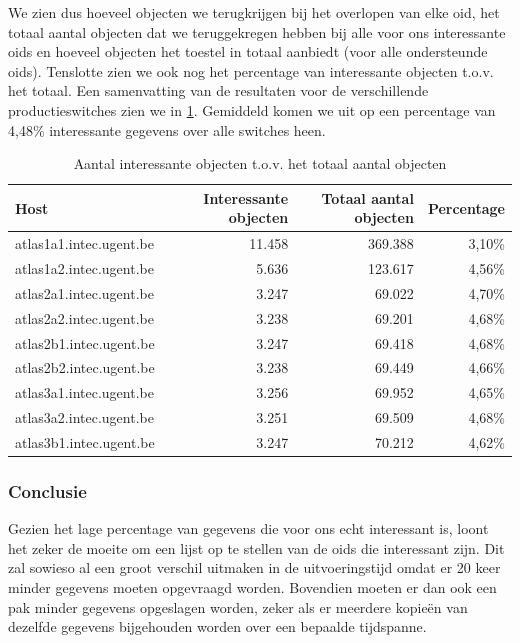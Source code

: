 We zien dus hoeveel objecten we terugkrijgen bij het overlopen van elke \gls{oid},
het totaal aantal objecten dat we teruggekregen hebben bij alle voor ons interessante \glspl{oid} en
hoeveel objecten het toestel in totaal aanbiedt (voor alle ondersteunde \glspl{oid}).
Tenslotte zien we ook nog het percentage van interessante objecten t.o.v. het totaal.
Een samenvatting van de resultaten voor de verschillende productieswitches zien we in \cref{tabel-fracties}.
Gemiddeld komen we uit op een percentage van 4,48\% interessante gegevens over alle switches heen.

\begin{table}[h]
\centering
\begin{tabular}{@{}lrrr@{}}
\toprule
Host                    & Interessante objecten & Totaal aantal objecten & Percentage \\ \midrule
atlas1a1.intec.ugent.be & 11.458                & 369.388                & 3,10\%     \\
atlas1a2.intec.ugent.be & 5.636                 & 123.617                & 4,56\%     \\
atlas2a1.intec.ugent.be & 3.247                 & 69.022                 & 4,70\%     \\
atlas2a2.intec.ugent.be & 3.238                 & 69.201                 & 4,68\%     \\
atlas2b1.intec.ugent.be & 3.247                 & 69.418                 & 4,68\%     \\
atlas2b2.intec.ugent.be & 3.238                 & 69.449                 & 4,66\%     \\
atlas3a1.intec.ugent.be & 3.256                 & 69.952                 & 4,65\%     \\
atlas3a2.intec.ugent.be & 3.251                 & 69.509                 & 4,68\%     \\
atlas3b1.intec.ugent.be & 3.247                 & 70.212                 & 4,62\%     \\ \bottomrule
\end{tabular}
\caption{Aantal interessante objecten t.o.v. het totaal aantal objecten}
\label{tabel-fracties}
\end{table}

\subsubsection{Conclusie}

Gezien het lage percentage van gegevens die voor ons echt interessant is,
loont het zeker de moeite om een lijst op te stellen van de \glspl{oid} die interessant zijn.
Dit zal sowieso al een groot verschil uitmaken in de uitvoeringstijd omdat er 20 keer minder gegevens moeten opgevraagd worden.
Bovendien moeten er dan ook een pak minder gegevens opgeslagen worden,
zeker als er meerdere kopieën van dezelfde gegevens bijgehouden worden over een bepaalde tijdspanne.


